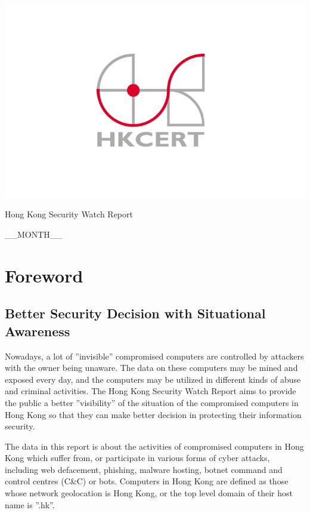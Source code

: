 \documentclass[__FONT_SIZE__]{extarticle}
\begin{document}
\vspace{1cm}

\includegraphics{HKCERT}

\vspace{4cm}

\centerline{\Huge Hong Kong Security Watch Report}

\vspace{2.5cm}

\centerline{\huge __MONTH__}
\newpage

\section*{Foreword}
\subsection*{Better Security Decision with Situational Awareness}

Nowadays, a lot of ''invisible'' compromised computers are controlled by attackers with the owner being unaware. The data on these computers may be mined and exposed every day, and the computers may be utilized in different kinds of abuse and criminal activities.
The Hong Kong Security Watch Report aims to provide the public a better ''visibility'' of the situation of the compromised computers in Hong Kong so that they can make better decision in protecting their information security.

The data in this report is about the activities of compromised computers in Hong Kong which suffer from, or participate in various forms of cyber attacks, including web defacement, phishing, malware hosting, botnet command and control centres (C\&C) or bots. Computers in Hong Kong are defined as those whose network geolocation is Hong Kong, or the top level domain of their host name is ''.hk''.
\end{document}
